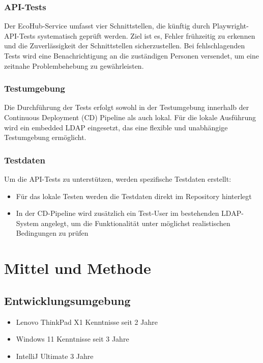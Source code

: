 \subsubsection{API-Tests}
Der EcoHub-Service umfasst vier Schnittstellen, die künftig durch Playwright-API-Tests
systematisch geprüft werden. Ziel ist es, Fehler frühzeitig zu erkennen und die Zuverlässigkeit der
Schnittstellen sicherzustellen. Bei fehlschlagenden Tests wird eine Benachrichtigung an die
zuständigen Personen versendet, um eine zeitnahe Problembehebung zu gewährleisten.

\subsubsection{Testumgebung}
Die Durchführung der Tests erfolgt sowohl in der Testumgebung innerhalb der Continuous
Deployment (CD) Pipeline als auch lokal. Für die lokale Ausführung wird ein embedded LDAP
eingesetzt, das eine flexible und unabhängige Testumgebung ermöglicht.

\subsubsection{Testdaten}
Um die API-Tests zu unterstützen, werden spezifische Testdaten erstellt:
\begin{itemize}
    \item Für das lokale Testen werden die Testdaten direkt im Repository hinterlegt
    \item In der CD-Pipeline wird zusätzlich ein Test-User im bestehenden LDAP-System angelegt, um die Funktionalität unter möglichst realistischen Bedingungen zu prüfen
\end{itemize}

\section{Mittel und Methode}
\subsection{Entwicklungsumgebung}
\begin{itemize}
    \item Lenovo ThinkPad X1 \hfill Kenntnisse seit 2 Jahre
    \item Windows 11 \hfill Kenntnisse seit 3 Jahre
    \item IntelliJ Ultimate \hfill 3 Jahre
\end{itemize}

